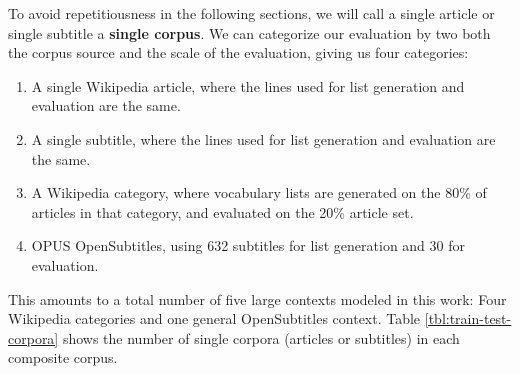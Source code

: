 %
To avoid repetitiousness in the following sections, we will call a single article or single subtitle a \textbf{single corpus}.
We can categorize our evaluation by two both the corpus source and the scale of the evaluation, giving us four categories:


\begin{enumerate}
	\item A single Wikipedia article, where the lines used for list generation and evaluation are the same.
	\item A single subtitle, where the lines used for list generation and evaluation are the same.
	\item A Wikipedia category, where vocabulary lists are generated on the 80\% of articles in that category, and evaluated on the 20\% article set.
	\item OPUS OpenSubtitles, using 632 subtitles for list generation and 30 for evaluation.
\end{enumerate}

This amounts to a total number of five large contexts modeled in this work:
Four Wikipedia categories and one general OpenSubtitles context.
Table \ref{tbl:train-test-corpora} shows the number of single corpora (articles or subtitles) in each composite corpus.

